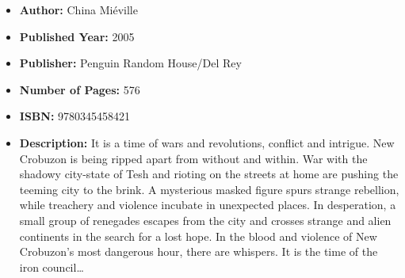 \documentclass{tufte-handout}
\begin{document}
\begin{itemize}
    \item[] \textbf{Author:} China Miéville
    \item[] \textbf{Published Year:} 2005  
    \item[] \textbf{Publisher:} Penguin Random House/Del Rey
    \item[] \textbf{Number of Pages:} 576      
    \item[] \textbf{ISBN:} 9780345458421
    \item[] \textbf{Description:} It is a time of wars and revolutions, conflict and intrigue. New Crobuzon is being ripped apart from without and within. War with the shadowy city-state of Tesh and rioting on the streets at home are pushing the teeming city to the brink. A mysterious masked figure spurs strange rebellion, while treachery and violence incubate in unexpected places. In desperation, a small group of renegades escapes from the city and crosses strange and alien continents in the search for a lost hope. In the blood and violence of New Crobuzon’s most dangerous hour, there are whispers. It is the time of the iron council\ldots
\end{itemize}
\end{document}
